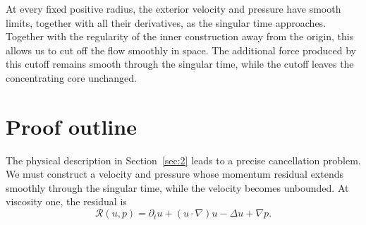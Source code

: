 At every fixed positive radius, the exterior velocity and pressure have smooth limits,
together with all their derivatives, as the singular time approaches. Together with the
regularity of the inner construction away from the origin, this allows us to cut off the flow
smoothly in space. The additional force produced by this cutoff remains smooth through the
singular time, while the cutoff leaves the concentrating core unchanged.

\section{Proof outline}\label{sec:3}

The physical description in Section~\ref{sec:2} leads to a precise cancellation problem. We must
construct a velocity and pressure whose momentum residual extends smoothly through the
singular time, while the velocity becomes unbounded. At viscosity one, the residual is
\begin{equation}
  \mathscr R(u,p)=\partial_tu+(u\cdot\nabla)u-\Delta u+\nabla p.
  \tag{3.1}\label{eq:3.1}
\end{equation}
